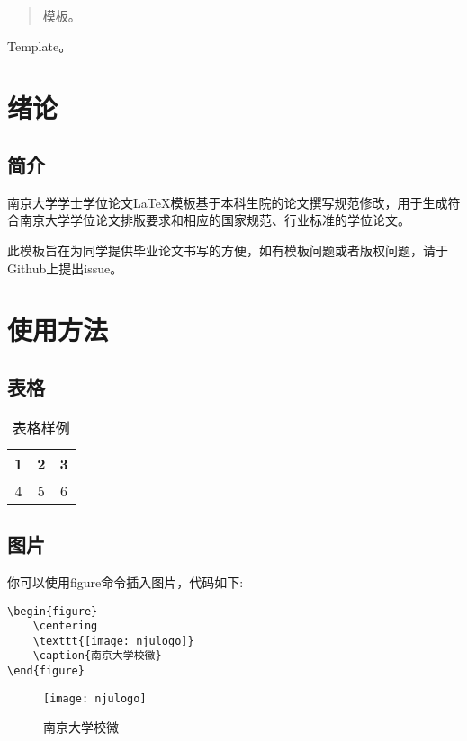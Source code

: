 \documentclass[
    TitleLength=1,%
]{njuthesis}
\begin{document}
\maketitle

\begin{abstract}
    模板。
\end{abstract}

\begin{englishabstract}
    Template。
\end{englishabstract}

\tableofcontents

\mainmatter

\chapter{绪论}
    \section{简介}
    南京大学学士学位论文\LaTeX 模板\cite{njuthesis}基于本科生院的论文撰写规范修改，用于生成符合南京大学学位论文排版要求和相应的国家规范、行业标准的学位论文。

    此模板旨在为同学提供毕业论文书写的方便，如有模板问题或者版权问题，请于Github上提出issue。
\chapter{使用方法}
    \section{表格}
    \begin{table}[htbp]
        \centering
        \caption{表格样例}
        \begin{tabular}{|c|c|c|}
            \hline
            1 & 2 & 3 \\
            \hline
            4 &  5 & 6 \\
            \hline
        \end{tabular}
    \end{table}
    \section{图片}
    你可以使用figure命令插入图片，代码如下:
    \begin{lstlisting}[language=Tex]
\begin{figure}
    \centering
    \texttt{[image: njulogo]}
    \caption{南京大学校徽}
\end{figure}
    \end{lstlisting}
    \begin{figure}[htbp]
        \centering
        \texttt{[image: njulogo]}
        \caption{南京大学校徽}
    \end{figure}

\printbibliography
\end{document}
